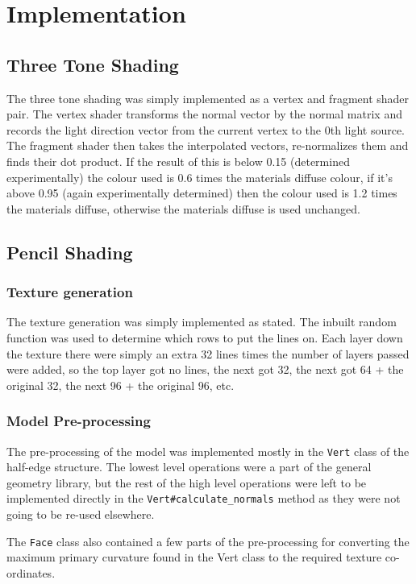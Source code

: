 \section{Implementation}

  \subsection{Three Tone Shading}

    The three tone shading was simply implemented as a vertex and fragment
    shader pair.  The vertex shader transforms the normal vector by the normal
    matrix and records the light direction vector from the current vertex to the
    0th light source.  The fragment shader then takes the interpolated vectors,
    re-normalizes them and finds their dot product.  If the result of this is
    below 0.15 (determined experimentally) the colour used is 0.6 times the
    materials diffuse colour, if it's above 0.95 (again experimentally
    determined) then the colour used is 1.2 times the materials diffuse,
    otherwise the materials diffuse is used unchanged.

  \subsection{Pencil Shading}

    \subsubsection{Texture generation}

      The texture generation was simply implemented as stated.  The inbuilt
      random function was used to determine which rows to put the lines on.
      Each layer down the texture there were simply an extra 32 lines times the
      number of layers passed were added, so the top layer got no lines, the
      next got 32, the next got 64 + the original 32, the next 96 + the original
      96, etc.

    \subsubsection{Model Pre-processing}

      The pre-processing of the model was implemented mostly in the
      \texttt{Vert} class of the half-edge structure.  The lowest level
      operations were a part of the general geometry library, but the rest of
      the high level operations were left to be implemented directly in the
      \texttt{Vert\#calculate\_normals} method as they were not going to be
      re-used elsewhere.

      The \texttt{Face} class also contained a few parts of the pre-processing
      for converting the maximum primary curvature found in the Vert class to
      the required texture co-ordinates.



